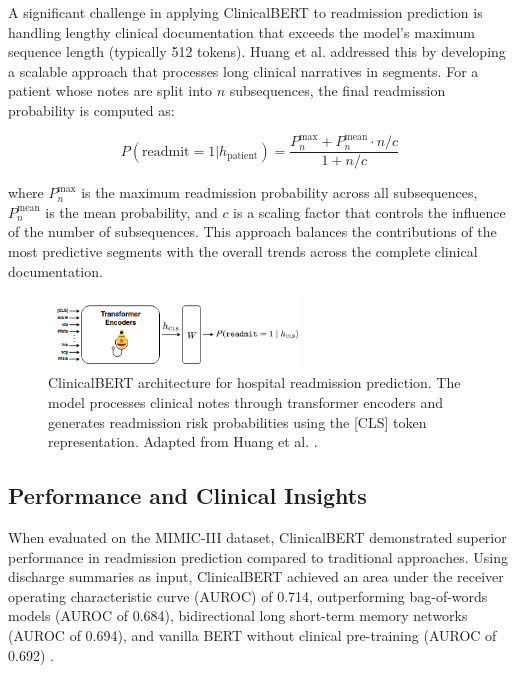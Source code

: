 \documentclass[3p,times,procedia]{elsarticle}
\begin{document}
A significant challenge in applying ClinicalBERT to readmission prediction is handling lengthy clinical documentation that exceeds the model's maximum sequence length (typically 512 tokens). Huang et al. \cite{Huang2020} addressed this by developing a scalable approach that processes long clinical narratives in segments. For a patient whose notes are split into $n$ subsequences, the final readmission probability is computed as:

\begin{equation}
P(\text{readmit} = 1 | h_{\text{patient}}) = \frac{P^{\text{max}}_{n} + P^{\text{mean}}_{n} \cdot n/c}{1 + n/c}
\end{equation}

where $P^{\text{max}}_{n}$ is the maximum readmission probability across all subsequences, $P^{\text{mean}}_{n}$ is the mean probability, and $c$ is a scaling factor that controls the influence of the number of subsequences. This approach balances the contributions of the most predictive segments with the overall trends across the complete clinical documentation.

\begin{figure}[h]
\centering
\includegraphics[width=0.6\textwidth]{images/clinicalbert_architecture.png}
\caption{ClinicalBERT architecture for hospital readmission prediction. The model processes clinical notes through transformer encoders and generates readmission risk probabilities using the [CLS] token representation. Adapted from Huang et al. \cite{Huang2020}.}
\label{fig:clinicalbert_architecture}
\end{figure}

\subsection{Performance and Clinical Insights}

When evaluated on the MIMIC-III dataset, ClinicalBERT demonstrated superior performance in readmission prediction compared to traditional approaches. Using discharge summaries as input, ClinicalBERT achieved an area under the receiver operating characteristic curve (AUROC) of 0.714, outperforming bag-of-words models (AUROC of 0.684), bidirectional long short-term memory networks (AUROC of 0.694), and vanilla BERT without clinical pre-training (AUROC of 0.692) \cite{Huang2020}.
\end{document}
